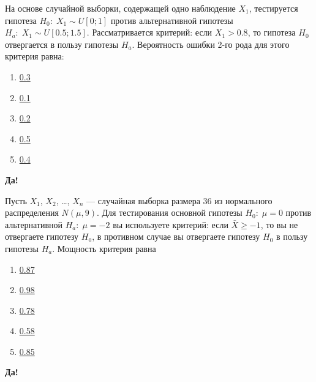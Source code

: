 \documentclass[t]{beamer}
\begin{document}
 \begin{frame} \label{44-Yes} 
\begin{block}{44} 

На основе случайной выборки, содержащей одно наблюдение  $X_1$, тестируется гипотеза $H_0: \; X_1 \sim U[0;1]$  против альтернативной гипотезы  $H_a: \; X_1 \sim U[0.5;1.5]$. Рассматривается критерий: если $X_1>0.8$, то гипотеза $H_0$  отвергается в пользу гипотезы  $H_a$. Вероятность ошибки 2-го рода для этого критерия равна:
 


 \end{block} 
\begin{enumerate} 
\item[] \hyperlink{44-Yes}{\beamergotobutton{} 0.3}
\item[] \hyperlink{44-No}{\beamergotobutton{} 0.1}
\item[] \hyperlink{44-No}{\beamergotobutton{} 0.2}
\item[] \hyperlink{44-No}{\beamergotobutton{} 0.5}
\item[] \hyperlink{44-No}{\beamergotobutton{} 0.4}
\end{enumerate} 

 \textbf{Да!} 
 \hyperlink{45}{}\end{frame} 


 \begin{frame} \label{45-Yes} 
\begin{block}{45} 

Пусть $X_1$, $X_2$, \ldots, $X_n$ — случайная выборка размера 36 из нормального распределения $N(\mu, 9)$. Для тестирования основной гипотезы  $H_0: \; \mu=0$  против альтернативной $H_a: \; \mu=-2$   вы используете критерий: если  $\bar{X}\geq -1$, то вы не отвергаете гипотезу $H_0$, в противном случае вы отвергаете гипотезу  $H_0$ в пользу гипотезы  $H_a$. Мощность критерия равна
 


 \end{block} 
\begin{enumerate} 
\item[] \hyperlink{45-No}{\beamergotobutton{} 0.87}
\item[] \hyperlink{45-Yes}{\beamergotobutton{} 0.98}
\item[] \hyperlink{45-No}{\beamergotobutton{} 0.78}
\item[] \hyperlink{45-No}{\beamergotobutton{} 0.58}
\item[] \hyperlink{45-No}{\beamergotobutton{} 0.85}
\end{enumerate} 

 \textbf{Да!} 
 \hyperlink{46}{}\end{frame} 
\end{document}
